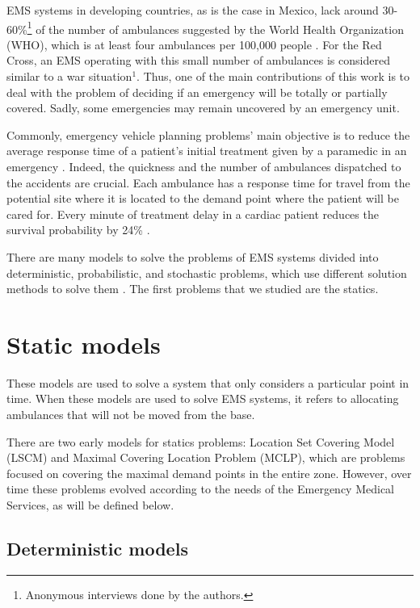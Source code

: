 EMS systems in developing countries, as is the case in Mexico, lack around 30-60\%\footnote{Anonymous interviews done by the authors.} of the number of ambulances suggested by the World Health Organization (WHO), which is at least four ambulances per 100,000 people \citep{braun1990characteristics}. For the Red Cross, an EMS operating with this small number of ambulances is considered similar to a war situation$^1$. Thus, one of the main contributions of this work is to deal with the problem of deciding if an emergency will be totally or partially covered. Sadly, some emergencies may remain uncovered by an emergency unit. 

Commonly, emergency vehicle planning problems' main objective is to reduce the average response time of a patient's initial treatment given by a paramedic in an emergency \citep{amorim2019traffic, bandara2012optimal,toro2013joint, toro2015reducing}. Indeed, the quickness and the number of ambulances dispatched to the accidents are crucial. Each ambulance has a response time for travel from the potential site where it is located to the demand point where the patient will be cared for. Every minute of treatment delay in a cardiac patient reduces the survival probability by 24\% \citep{o2010role}.  

There are many models to solve the problems of EMS systems divided into deterministic, probabilistic, and stochastic problems, which use different solution methods to solve them \cite{brotcorne2003ambulance}. The first problems that we studied are the statics. 

\section{Static models}

These models are used to solve a system that only considers a particular point in time. When these models are used to solve EMS systems, it refers to allocating ambulances that will not be moved from the base. 

There are two early models for statics problems: Location Set Covering Model (LSCM) and Maximal Covering Location Problem (MCLP), which are problems focused on covering the maximal demand points in the entire zone. However, over time these problems evolved according to the needs of the Emergency Medical Services, as will be defined below.


\subsection{Deterministic models}

